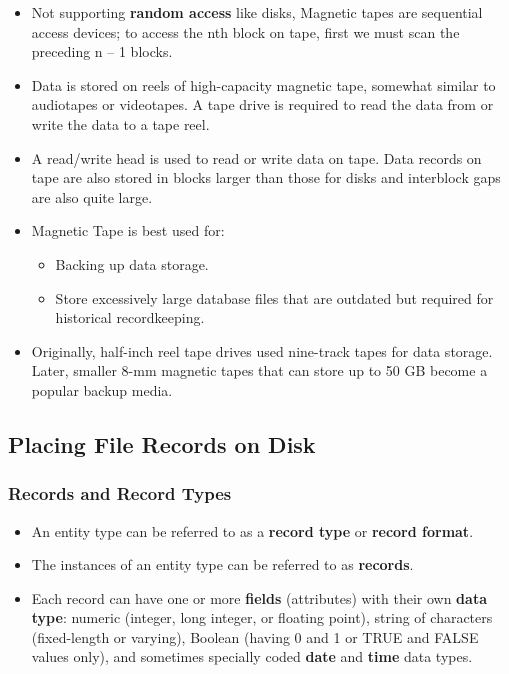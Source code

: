 \documentclass[10pt]{article}
\newcommand{\tf}{\textbf}
\begin{document}
\begin{itemize}
	\item Not supporting \tf{random access} like disks, Magnetic tapes are sequential access devices; to access the nth block on tape, first we must scan the preceding n – 1 blocks.
	\item Data is stored on reels of high-capacity magnetic tape, somewhat similar to audiotapes or videotapes. A tape drive is required to read the data from or write the data to a tape reel. 
	\item A read/write head is used to read or write data on tape. Data records on tape are also stored in blocks larger than those for disks and interblock gaps are also quite large. 
	\item Magnetic Tape is best used for:
	\begin{itemize}
		\item Backing up data storage.
		\item Store excessively large database files that are outdated but required for historical recordkeeping. 
	\end{itemize}

	\item Originally, half-inch reel tape drives used nine-track tapes for data storage. Later, smaller 8-mm magnetic tapes that can store up to 50 GB become a popular backup media.
\end{itemize}

\subsection{Placing File Records on Disk}

\subsubsection{Records and Record Types}

\begin{itemize}
	\item An entity type can be referred to as a \tf{record type} or \tf{record format}. 
	\item The instances of an entity type can be referred to as \tf{records}.
	\item Each record can have one or more \tf{fields} (attributes) with their own \tf{data type}: numeric (integer, long integer, or floating point), string of characters (fixed-length or varying), Boolean (having 0 and 1 or TRUE and FALSE values only), and sometimes specially coded \tf{date} and \tf{time} data types. 
\end{itemize}
\end{document}
